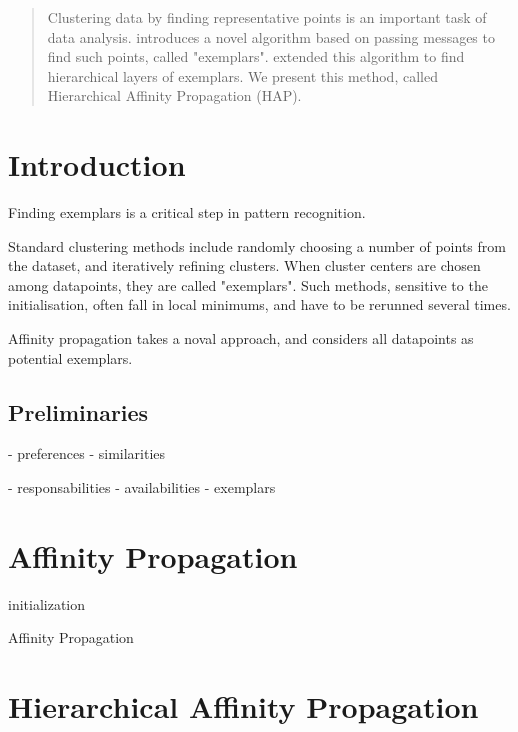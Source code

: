 \documentclass{ipol}
\begin{document}
\begin{abstract}

Clustering data by finding representative points is an important task of data
analysis. \cite{frey07affinitypropagation} introduces a novel algorithm based
on passing messages to find such points, called "exemplars". \cite{hap}
extended this algorithm to find hierarchical layers of exemplars. We present
this method, called Hierarchical Affinity Propagation (HAP).

\end{abstract}

\begin{ipolCode}
\end{ipolCode}

\begin{ipolSupp}
\end{ipolSupp}

\section{Introduction}

Finding exemplars is a critical step in pattern recognition. 

Standard clustering methods include randomly choosing a number of points from
the dataset, and iteratively refining clusters. When cluster centers are
chosen among datapoints, they are called "exemplars". Such methods, sensitive to the
initialisation, often fall in local minimums, and have to be rerunned several
times.

Affinity propagation takes a noval approach, and considers all datapoints as
potential exemplars.

\subsection{Preliminaries}

- preferences
- similarities

- responsabilities
- availabilities
- exemplars

\section{Affinity Propagation}

\begin{algorithm}[H]
     \SetLine

     initialization\;
     \caption{Affinity Propagation}
\end{algorithm}


\section{Hierarchical Affinity Propagation}


\end{document}
